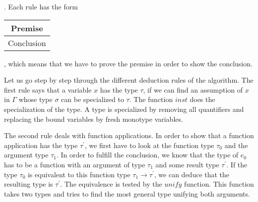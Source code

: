 \begin{prooftree}
\end{prooftree}

\begin{prooftree}
\end{prooftree}

\begin{prooftree}
\end{prooftree}

\begin{prooftree}
\end{prooftree}
.
Each rule has the form
\begin{tabular}{c}
Premise\\
\hline
Conclusion
\end{tabular}, which means that we have to prove the premise in order to show the conclusion.

Let us go step by step through the different deduction rules of the algorithm.
The first rule says that a variable $x$ has the type $\tau$, if we can find an assumption of $x$ in $\Gamma$ whose type $\sigma$ can be specialized to $\tau$.
The function $inst$ does the specialization of the type.
A type is specialized by removing all quantifiers and replacing the bound variables by fresh monotype variables.

The second rule deals with function applications.
In order to show that a function application has the type $\tau^\prime$, we first have to look at the function type $\tau_0$ and the argument type $\tau_1$.
In order to fulfill the conclusion, we know that the type of $e_0$ has to be a function with an argument of type $\tau_1$ and some result type $\tau^\prime$.
If the type $\tau_0$ is equivalent to this function type $\tau_1\rightarrow\tau^\prime$, we can deduce that the resulting type is $\tau^\prime$.
The equivalence is tested by the $unify$ function.
This function takes two types and tries to find the most general type unifying both arguments.

